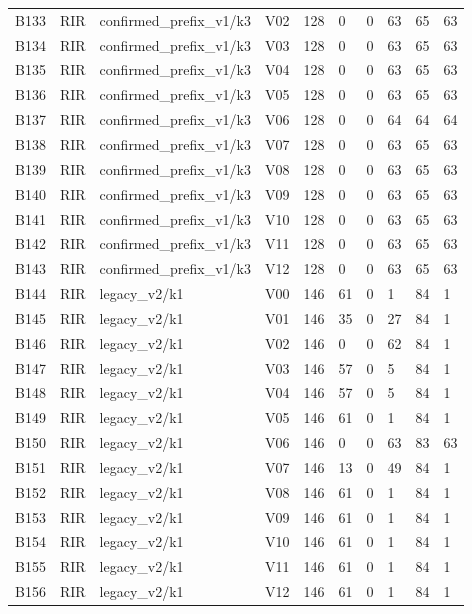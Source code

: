 \begin{longtable}{llllllllll}
B133 & RIR & confirmed\_prefix\_v1/k3 & V02 & 128 & 0 & 0 & 63 & 65 & 63 \\
B134 & RIR & confirmed\_prefix\_v1/k3 & V03 & 128 & 0 & 0 & 63 & 65 & 63 \\
B135 & RIR & confirmed\_prefix\_v1/k3 & V04 & 128 & 0 & 0 & 63 & 65 & 63 \\
B136 & RIR & confirmed\_prefix\_v1/k3 & V05 & 128 & 0 & 0 & 63 & 65 & 63 \\
B137 & RIR & confirmed\_prefix\_v1/k3 & V06 & 128 & 0 & 0 & 64 & 64 & 64 \\
B138 & RIR & confirmed\_prefix\_v1/k3 & V07 & 128 & 0 & 0 & 63 & 65 & 63 \\
B139 & RIR & confirmed\_prefix\_v1/k3 & V08 & 128 & 0 & 0 & 63 & 65 & 63 \\
B140 & RIR & confirmed\_prefix\_v1/k3 & V09 & 128 & 0 & 0 & 63 & 65 & 63 \\
B141 & RIR & confirmed\_prefix\_v1/k3 & V10 & 128 & 0 & 0 & 63 & 65 & 63 \\
B142 & RIR & confirmed\_prefix\_v1/k3 & V11 & 128 & 0 & 0 & 63 & 65 & 63 \\
B143 & RIR & confirmed\_prefix\_v1/k3 & V12 & 128 & 0 & 0 & 63 & 65 & 63 \\
B144 & RIR & legacy\_v2/k1 & V00 & 146 & 61 & 0 & 1 & 84 & 1 \\
B145 & RIR & legacy\_v2/k1 & V01 & 146 & 35 & 0 & 27 & 84 & 1 \\
B146 & RIR & legacy\_v2/k1 & V02 & 146 & 0 & 0 & 62 & 84 & 1 \\
B147 & RIR & legacy\_v2/k1 & V03 & 146 & 57 & 0 & 5 & 84 & 1 \\
B148 & RIR & legacy\_v2/k1 & V04 & 146 & 57 & 0 & 5 & 84 & 1 \\
B149 & RIR & legacy\_v2/k1 & V05 & 146 & 61 & 0 & 1 & 84 & 1 \\
B150 & RIR & legacy\_v2/k1 & V06 & 146 & 0 & 0 & 63 & 83 & 63 \\
B151 & RIR & legacy\_v2/k1 & V07 & 146 & 13 & 0 & 49 & 84 & 1 \\
B152 & RIR & legacy\_v2/k1 & V08 & 146 & 61 & 0 & 1 & 84 & 1 \\
B153 & RIR & legacy\_v2/k1 & V09 & 146 & 61 & 0 & 1 & 84 & 1 \\
B154 & RIR & legacy\_v2/k1 & V10 & 146 & 61 & 0 & 1 & 84 & 1 \\
B155 & RIR & legacy\_v2/k1 & V11 & 146 & 61 & 0 & 1 & 84 & 1 \\
B156 & RIR & legacy\_v2/k1 & V12 & 146 & 61 & 0 & 1 & 84 & 1 \\

\end{longtable}
